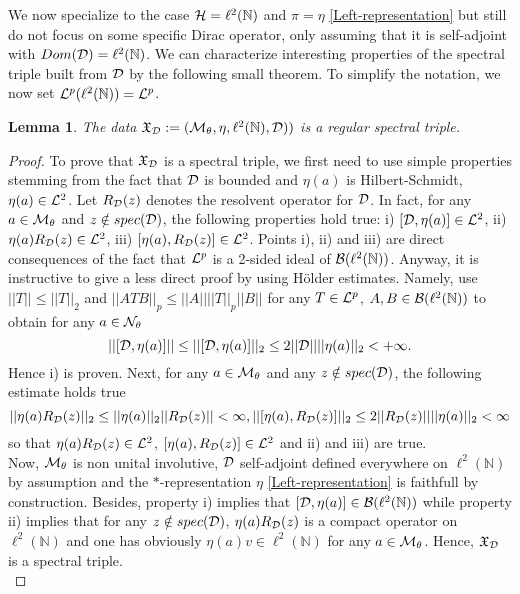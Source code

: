 \documentclass[a4paper,11pt,twoside]{article}
\numberwithin{equation}{section}
\newtheorem{lemma}[Theorem]{Lemma}
\theoremstyle{nonumberplain}
\newtheorem{proof}{Proof}
\begin{document}
We now specialize to the case ${\cal{H}}=\ell^2(\mathbb{N})$ and $\pi=\eta$ \eqref{Left-representation} but still do not focus on some specific Dirac operator, only assuming that it is self-adjoint with $Dom({\cal{D}})=\ell^2(\mathbb{N})$. We can characterize interesting properties of the spectral triple built from ${\cal{D}}$ by the following small theorem. To simplify the notation, we now set 
${\cal{L}}^p(\ell^2(\mathbb{N}))={\cal{L}}^p$.
\begin{lemma}\label{th1}
The data $\mathfrak{X}_{{\cal{D}}}:=({\cal{M}}_\theta,\eta,\ell^2(\mathbb{N}), {\cal{D}}))$ is a regular spectral triple.
\end{lemma}
\begin{proof}
To prove that $\mathfrak{X}_{{\cal{D}}}$ is a spectral triple, we first need to use simple properties stemming from the fact that ${\cal{D}}$ is bounded and $\eta(a)$ is Hilbert-Schmidt, $\eta(a)\in{\cal{L}}^2$. Let $R_{\cal{D}}(z)$ denotes the resolvent operator for ${\cal{D}}$. In fact, for any $a\in{\cal{M}}_\theta$ and $z\notin spec({\cal{D}})$, the following properties hold true: i) $[{\cal{D}},\eta(a)]\in{\cal{L}}^2$, ii) $\eta(a)R_{\cal{D}}(z)\in{\cal{L}}^2$, iii) $[\eta(a),R_{\cal{D}}(z)]\in{\cal{L}}^2$. Points i), ii) and iii) are direct consequences of the fact that ${\cal{L}}^p$ is a 2-sided ideal of ${\cal{B}}(\ell^2(\mathbb{N}))$. Anyway, it is instructive to give a less direct proof by using H\"older estimates. Namely, use $||T||\le||T||_2$ and $||ATB||_p\le||A||||T||_p||B||$ for any $T\in{\cal{L}}^p$, $A,B\in{\cal{B}}(\ell^2(\mathbb{N}))$ to obtain for any $a\in{\cal{N}}_\theta$
\begin{equation}
||[{\cal{D}},\eta(a)]||\le||[{\cal{D}},\eta(a)]||_2\le2||{\cal{D}}||||\eta(a)||_2<+\infty\label{estimate-triple11}.
\end{equation}
Hence i) is proven. Next, for any $a\in{\cal{M}}_\theta$ and any $z\notin spec({\cal{D}})$, the following estimate holds true
\begin{equation}
||\eta(a)R_{\cal{D}}(z)||_2\le||\eta(a)||_2||R_{\cal{D}}(z)||<\infty, ||[\eta(a),R_{\cal{D}}(z)]||_2\le2||R_{\cal{D}}(z)||||\eta(a)||_2<\infty\label{estimate-triple22}
\end{equation}
so that $\eta(a)R_{{\cal{D}}}(z)\in{\cal{L}}^2$, $[\eta(a),R_{\cal{D}}(z)]\in{\cal{L}}^2$ and ii) and iii) are true.\\
Now, ${\cal{M}}_\theta$ is non unital involutive, ${\cal{D}}$ self-adjoint defined everywhere on $\ell^2(\mathbb{N})$ by assumption and the $*$-representation $\eta$ \eqref{Left-representation} is faithfull by construction. Besides, property i) implies that $[{\cal{D}},\eta(a)]\in{\cal{B}}(\ell^2(\mathbb{N}))$ while property ii) implies that for any $z\notin spec({\cal{D}})$, $\eta(a)R_{\cal{D}}(z)$ is a compact operator on $\ell^2(\mathbb{N})$ and one has obviously $\eta(a)v\in\ell^2(\mathbb{N})$ for any $a\in{\cal{M}}_\theta$. Hence, $\mathfrak{X}_{{\cal{D}}}$ is a spectral triple.\\

\end{proof}
\end{document}
